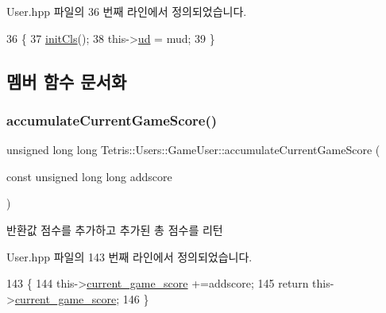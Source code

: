 User.\+hpp 파일의 36 번째 라인에서 정의되었습니다.


\begin{DoxyCode}
36                                        \{
37                     \hyperlink{class_tetris_1_1_users_1_1_game_user_a8ec8ca43d0c6d0dc2c2e049ae1b4d316}{initCls}();
38                     this->\hyperlink{class_tetris_1_1_users_1_1_game_user_ac1f44d636258caa01f3041408d235289}{ud} = mud;
39                 \}
\end{DoxyCode}


\subsection{멤버 함수 문서화}
\mbox{\label{class_tetris_1_1_users_1_1_game_user_a5808d26769ba24d9e6435e40d3feb7af}} 
\subsubsection{\texorpdfstring{accumulate\+Current\+Game\+Score()}{accumulateCurrentGameScore()}}
{\footnotesize\ttfamily unsigned long long Tetris\+::\+Users\+::\+Game\+User\+::accumulate\+Current\+Game\+Score (\begin{DoxyParamCaption}\item[{const unsigned long long}]{addscore }\end{DoxyParamCaption})\hspace{0.3cm}{\ttfamily [inline]}}

\begin{DoxyReturn}{반환값}
점수를 추가하고 추가된 총 점수를 리턴 
\end{DoxyReturn}


User.\+hpp 파일의 143 번째 라인에서 정의되었습니다.


\begin{DoxyCode}
143                                                                                             \{
144                 this->\hyperlink{class_tetris_1_1_users_1_1_game_user_aae9d0156964b3872f7cd3917ae662ec2}{current\_game\_score} +=addscore;
145                 \textcolor{keywordflow}{return} this->\hyperlink{class_tetris_1_1_users_1_1_game_user_aae9d0156964b3872f7cd3917ae662ec2}{current\_game\_score};
146             \}
\end{DoxyCode}
\mbox{\label{class_tetris_1_1_users_1_1_game_user_a89c6053fbb03b4fbfcd3fec883a87765}} 

